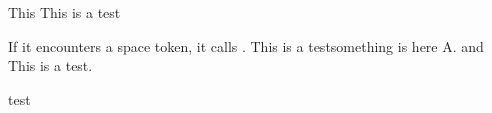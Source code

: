 \documentclass{book}
\makeatletter
\def\@test{This is a test}
\makeatother
\begin{document}
 This \@test

 If it encounters a space
    token, it calls \@xifnch.
   \@test  something is here A\@. and This is a test.
 
 test 
\end{document}
